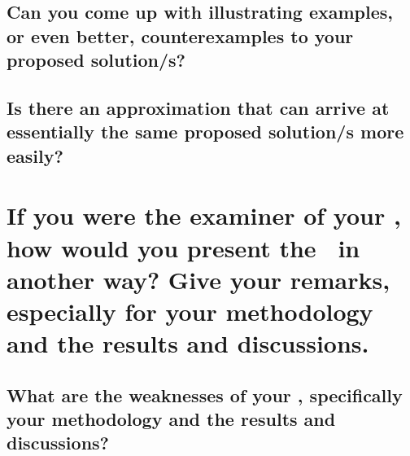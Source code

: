 \subsection*{\thesubsection\quad Can you come up with illustrating examples, or even better, counterexamples to your proposed solution/s?}

\subsection*{\thesubsection\quad Is there an approximation that can arrive at essentially the same proposed solution/s more easily?}
	
\section*{\thesection\quad If you were the examiner of your \documentType, how would you present the \documentType \ in another way?  Give your remarks, especially for your methodology and the results and discussions.}

	
\subsection*{\thesubsection\quad What are the weaknesses of your \documentType, specifically  your methodology and the results and discussions?}
